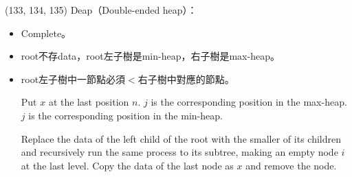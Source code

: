 \item \begin{theorem}{(133, 134, 135)} Deap（Double-ended heap）： \label{deap}\begin{itemize}
        \item Complete。
        \item root不存data，root左子樹是min-heap，右子樹是max-heap。
        \item root左子樹中一節點必須$<$右子樹中對應的節點。
        \begin{algorithm}[H]
            \begin{algorithmic}[1]
                    \State Put $x$ at the last position $n$.
                        \State $j$ is the corresponding position in the max-heap.
                            \State {}
                            \State {}
                        \Else
                            \State {}
                        \EndIf
                    \Else {}
                        \State $j$ is the corresponding position in the min-heap.
                            \State {}
                            \State {}
                        \Else
                            \State {}
                        \EndIf
                    \EndIf
                \EndFunction
            \end{algorithmic}
        \end{algorithm} 
        \begin{algorithm}[H]
            \begin{algorithmic}[1]
                    \State Replace the data of the left child of the root with the smaller of its children and recursively run the same process to its subtree, making an empty node $i$ at the last level. 
                    \State Copy the data of the last node as $x$ and remove the node.
                    \State {}
                \EndFunction
            \end{algorithmic}
        \end{algorithm}
    \end{itemize}
\end{theorem}

